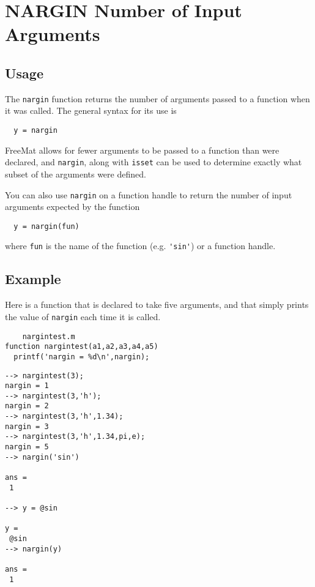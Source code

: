 \section{NARGIN Number of Input Arguments}

\subsection{Usage}

The \verb|nargin| function returns the number of arguments passed
to a function when it was called.  The general syntax for its
use is
\begin{verbatim}
  y = nargin
\end{verbatim}
FreeMat allows for
fewer arguments to be passed to a function than were declared,
and \verb|nargin|, along with \verb|isset| can be used to determine
exactly what subset of the arguments were defined.

You can also use \verb|nargin| on a function handle to return the
number of input arguments expected by the function
\begin{verbatim}
  y = nargin(fun)
\end{verbatim}
where \verb|fun| is the name of the function (e.g. \verb|'sin'|) or 
a function handle.
\subsection{Example}

Here is a function that is declared to take five 
arguments, and that simply prints the value of \verb|nargin|
each time it is called.
\begin{verbatim}
    nargintest.m
function nargintest(a1,a2,a3,a4,a5)
  printf('nargin = %d\n',nargin);
\end{verbatim}
\begin{verbatim}
--> nargintest(3);
nargin = 1
--> nargintest(3,'h');
nargin = 2
--> nargintest(3,'h',1.34);
nargin = 3
--> nargintest(3,'h',1.34,pi,e);
nargin = 5
--> nargin('sin')

ans = 
 1 

--> y = @sin

y = 
 @sin
--> nargin(y)

ans = 
 1 
\end{verbatim}
